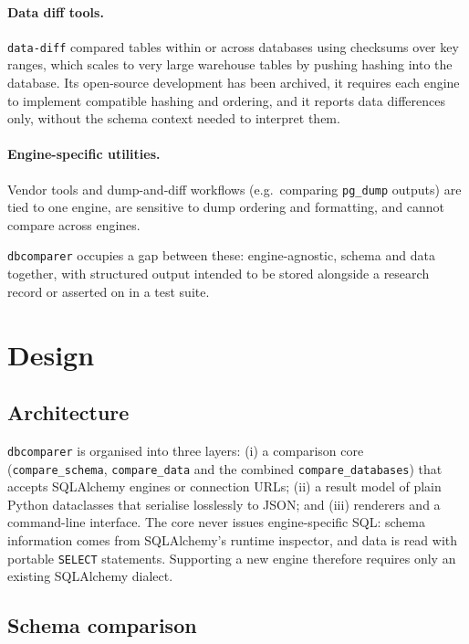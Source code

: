 \documentclass[11pt]{article}
\begin{document}
\paragraph{Data diff tools.} \texttt{data-diff} \citep{datadiff} compared
tables within or across databases using checksums over key ranges, which
scales to very large warehouse tables by pushing hashing into the
database. Its open-source development has been archived, it requires each
engine to implement compatible hashing and ordering, and it reports data
differences only, without the schema context needed to interpret them.

\paragraph{Engine-specific utilities.} Vendor tools and dump-and-diff
workflows (e.g.\ comparing \texttt{pg\_dump} outputs) are tied to one
engine, are sensitive to dump ordering and formatting, and cannot compare
across engines.

\texttt{dbcomparer} occupies a gap between these: engine-agnostic, schema
and data together, with structured output intended to be stored alongside a
research record or asserted on in a test suite.

\section{Design}

\subsection{Architecture}

\texttt{dbcomparer} is organised into three layers: (i) a comparison core
(\texttt{compare\_schema}, \texttt{compare\_data} and the combined
\texttt{compare\_databases}) that accepts SQLAlchemy engines or connection
URLs; (ii) a result model of plain Python dataclasses that serialise
losslessly to JSON; and (iii) renderers and a command-line interface. The
core never issues engine-specific SQL: schema information comes from
SQLAlchemy's runtime inspector, and data is read with portable
\texttt{SELECT} statements. Supporting a new engine therefore requires only
an existing SQLAlchemy dialect.

\subsection{Schema comparison}
\end{document}

